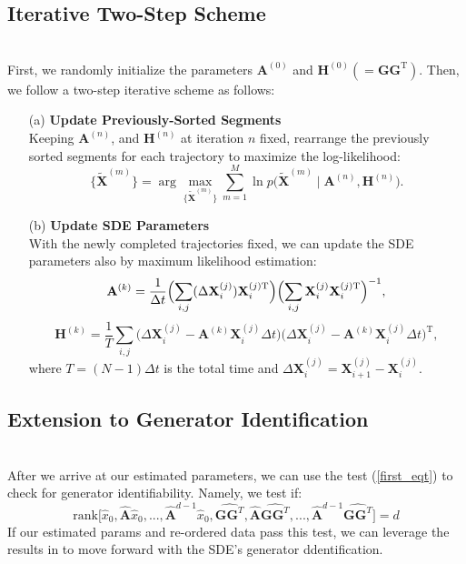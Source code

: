 \documentclass[a4paper, 11pt]{article}
\begin{document}
\begin{sloppypar}
\subsection{Iterative Two-Step Scheme} \mbox{}\\
First, we randomly initialize the parameters
$\mathbf{A}^{(0)}$ and $\mathbf{H}^{(0)} (= \mathbf{GG}^{\text{T}})$. Then, we follow a two-step
iterative scheme as follows:
\begin{enumerate}
  \item[(a)] \textbf{Update Previously-Sorted Segments} \\
    Keeping $\mathbf{A}^{(n)}$, and $\mathbf{H}^{(n)}$ at iteration $n$ fixed, rearrange the
    previously sorted segments for each trajectory to maximize the log-likelihood:
    \[
    \{\widetilde{\mathbf{X}}^{(m)}\}
    = 
    \arg\max_{\{\widetilde{\mathbf{X}}^{(m)}\}}
    \sum_{m=1}^M
    \ln p\bigl(\widetilde{\mathbf{X}}^{(m)} \mid \mathbf{A}^{(n)}, \mathbf{H}^{(n)}\bigr).
    \]
  \item[(b)] \textbf{Update SDE Parameters} \\
    With the newly completed trajectories fixed, we can update the SDE parameters also by maximum likelihood estimation:
    \[
    \mathbf{A}^{(k)}
    = 
    \frac{1}{\Delta t}
    \Bigl(\sum_{i, j}(\Delta\mathbf{X}_i^{(j)})\mathbf{X}_i^{(j)\text{T}}\Bigr)
    \Bigl(\sum_{i, j}\mathbf{X}_i^{(j)}\mathbf{X}_i^{(j)\text{T}}\Bigr)^{-1},
    \]
    \[
    \mathbf{H}^{(k)} 
    = 
    \frac{1}{T}
    \sum_{i, j}
    \bigl(\Delta\mathbf{X}_i^{(j)} - \mathbf{A}^{(k)}\mathbf{X}_i^{(j)}\Delta t\bigr)
    \bigl(\Delta\mathbf{X}_i^{(j)} - \mathbf{A}^{(k)}\mathbf{X}_i^{(j)}\Delta t\bigr)^{\text{T}},
    \]
    where $T = (N - 1)\Delta t$ is the total time and 
    $\Delta\mathbf{X}_i^{(j)} = \mathbf{X}_{i+1}^{(j)} - \mathbf{X}_i^{(j)}$.
  \end{enumerate}

\subsection{Extension to Generator Identification} \mbox{}\\
After we arrive at our estimated parameters, we can use the test (\ref{first_eqt}) to check for generator identifiability.
Namely, we test if:
\[
\text{rank}\bigl[\hat{x}_0, \hat{\mathbf{A}}\hat{x}_0, ..., \hat{\mathbf{A}}^{d-1}\hat{x}_0,
\widehat{\mathbf{GG}^T}, \hat{\mathbf{A}}\widehat{\mathbf{GG}^T}, ..., \hat{\mathbf{A}}^{d-1}\widehat{\mathbf{GG}^T}
\bigr] = d
\]
If our estimated params and re-ordered data pass this test, we can leverage the results in \cite{NEURIPS2023_ca642f8e} to
move forward with the SDE's generator ddentification.

\end{sloppypar}
\end{document}
